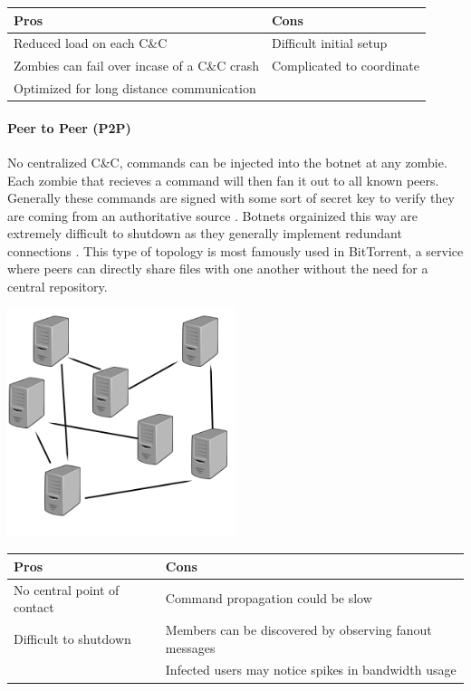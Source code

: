 \begin{tabular}{p{8cm} | p{8cm}}
  \textbf{Pros} & \textbf{Cons} \\ \hline
  \textbullet{}Reduced load on each C\&C                    & \textbullet{}Difficult initial setup \\
  \textbullet{}Zombies can fail over incase of a C\&C crash & \textbullet{}Complicated to coordinate\\
  \textbullet{}Optimized for long distance communication    & \\
\end{tabular}

\paragraph{Peer to Peer (P2P) \cite{topology}}
No centralized C\&C, commands can be injected into the botnet at any zombie.
Each zombie that recieves a command will then fan it out to all known peers.
Generally these commands are signed with some sort of secret key to verify they
are coming from an authoritative source \cite{topology}. Botnets orgainized
this way are extremely difficult to shutdown as they generally implement redundant
connections \cite{topology}.  This type of topology is most famously used in BitTorrent,
a service where peers can directly share files with one another without the need for a central
repository.

\begin{center}
  \includegraphics[width=0.5\textwidth]{assets/p2ptopo.png}
  \label{fig:p2p_topo_fig}
\end{center}

\begin{tabular}{p{8cm} | p{8cm}}
  \textbf{Pros} & \textbf{Cons} \\ \hline
  \textbullet{}No central point of contact & \textbullet{}Command propagation could be slow \\
  \textbullet{}Difficult to shutdown       & \textbullet{}Members can be discovered by observing fanout messages\\
                                           & \textbullet{}Infected users may notice spikes in bandwidth usage\\
\end{tabular}

